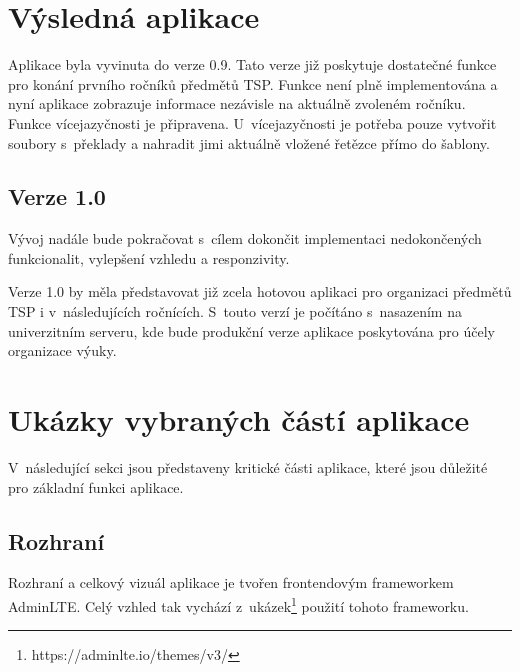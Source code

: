 \documentclass[czech,BP]{thesiskiv}
\begin{document}
	\section{Výsledná aplikace}
	\par Aplikace byla vyvinuta do verze 0.9. Tato verze již poskytuje dostatečné funkce pro konání prvního ročníků předmětů TSP. Funkce  není plně implementována a nyní aplikace zobrazuje informace nezávisle na aktuálně zvoleném ročníku. Funkce vícejazyčnosti je připravena. U~vícejazyčnosti je potřeba pouze vytvořit soubory s~překlady a nahradit jimi aktuálně vložené řetězce přímo do šablony.
	\subsection{Verze 1.0}
	\par Vývoj nadále bude pokračovat s~cílem dokončit implementaci nedokončených funkcionalit, vylepšení vzhledu a responzivity.
	\par Verze 1.0 by měla představovat již zcela hotovou aplikaci pro organizaci předmětů TSP i v~následujících ročnících. S~touto verzí je počítáno s~nasazením na univerzitním serveru, kde bude produkční verze aplikace poskytována pro účely organizace výuky.
	\section{Ukázky vybraných částí aplikace}
	\par V~následující sekci jsou představeny kritické části aplikace, které jsou důležité pro základní funkci aplikace.
	\subsection{Rozhraní}
	\par Rozhraní a celkový vizuál aplikace je tvořen frontendovým frameworkem AdminLTE. Celý vzhled tak vychází z~ukázek\footnote{https://adminlte.io/themes/v3/} použití tohoto frameworku.
\end{document}

